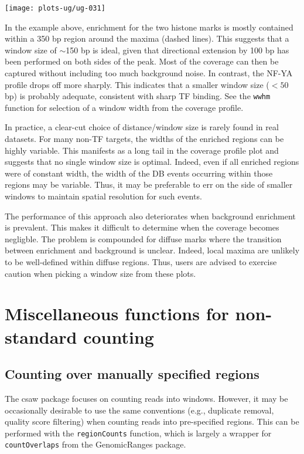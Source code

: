 \documentclass[12pt]{report}
\newcommand{\pkgname}{csaw}
\newcommand{\code}[1]{{\small\texttt{#1}}}
\newcommand{\granges}{GenomicRanges}
\begin{document}
\begin{center}
\texttt{[image: plots-ug/ug-031]}
\end{center}

In the example above, enrichment for the two histone marks is mostly contained within a 350 bp region around the maxima (dashed lines).
This suggests that a window size of $\sim$150 bp is ideal, given that directional extension by 100 bp has been performed on both sides of the peak.
Most of the coverage can then be captured without including too much background noise.
In contrast, the NF-YA profile drops off more sharply.
This indicates that a smaller window size ($< 50$ bp) is probably adequate, consistent with sharp TF binding.
See the \code{wwhm} function for selection of a window width from the coverage profile.

In practice, a clear-cut choice of distance/window size is rarely found in real datasets.
For many non-TF targets, the widths of the enriched regions can be highly variable.
This manifests as a long tail in the coverage profile plot and suggests that no single window size is optimal.
Indeed, even if all enriched regions were of constant width, the width of the DB events occurring within those regions may be variable.
Thus, it may be preferable to err on the side of smaller windows to maintain spatial resolution for such events.

The performance of this approach also deteriorates when background enrichment is prevalent.
This makes it difficult to determine when the coverage becomes negligble.
The problem is compounded for diffuse marks where the transition between enrichment and background is unclear.
Indeed, local maxima are unlikely to be well-defined within diffuse regions.
Thus, users are advised to exercise caution when picking a window size from these plots.

\section{Miscellaneous functions for non-standard counting}

\subsection{Counting over manually specified regions}
The \pkgname{} package focuses on counting reads into windows. 
However, it may be occasionally desirable to use the same conventions (e.g., duplicate removal, quality score filtering) when counting reads into pre-specified regions. 
This can be performed with the \code{regionCounts} function, which is largely a wrapper for \code{countOverlaps} from the \granges{} package.
\end{document}
